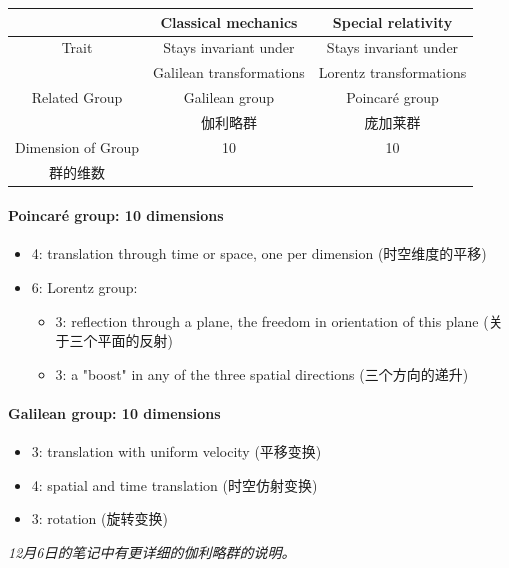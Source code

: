 \begin{center}
    \begin{tabular}{|c|c|c|}
        \hline
        & Classical mechanics & Special relativity \\
        \hline
        Trait & Stays invariant under & Stays invariant under \\ & Galilean transformations & Lorentz transformations \\
        \hline
        Related Group & Galilean group& Poincaré group \\
        & 伽利略群 & 庞加莱群 \\
        \hline
        Dimension of Group & 10 & 10 \\
        群的维数 & & \\
        \hline
    \end{tabular}
\end{center}

\paragraph{Poincaré group: 10 dimensions}
\begin{itemize}
\tightlist{}
    \item 4: translation through time or space, one per dimension (时空维度的平移)
    \item 6: Lorentz group:
    \begin{itemize}
\tightlist{}
        \item 3: reflection through a plane, the freedom in orientation of this plane (关于三个平面的反射)
        \item 3: a "boost" in any of the three spatial directions (三个方向的递升)
    \end{itemize}
\end{itemize}

\paragraph{Galilean group: 10 dimensions}
\begin{itemize}
\tightlist{}
    \item 3: translation with uniform velocity (平移变换)
    \item 4: spatial and time translation (时空仿射变换)
    \item 3: rotation (旋转变换)
\end{itemize}

\emph{12月6日的笔记中有更详细的伽利略群的说明。}
